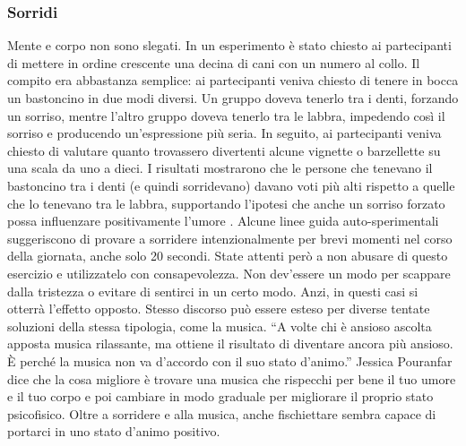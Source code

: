 \documentclass[12pt]{book} %
\begin{document}
\subsubsection{Sorridi}
Mente e corpo non sono slegati. In un esperimento è stato chiesto ai partecipanti di mettere in ordine crescente una
decina di cani con un numero al collo. Il compito era abbastanza semplice: ai partecipanti veniva chiesto di tenere in bocca un bastoncino in due modi diversi. Un gruppo doveva tenerlo tra i denti, forzando un sorriso, mentre l'altro gruppo doveva tenerlo tra le labbra, impedendo così il sorriso e producendo un'espressione più seria. In seguito, ai partecipanti veniva chiesto di valutare quanto trovassero divertenti alcune vignette o barzellette su una scala da uno a dieci. I risultati mostrarono che le persone che tenevano il bastoncino tra i denti (e quindi sorridevano) davano voti più alti rispetto a quelle che lo tenevano tra le labbra, supportando l'ipotesi che anche un sorriso forzato possa influenzare positivamente l’umore   .
Alcune linee guida auto-sperimentali suggeriscono di provare a sorridere intenzionalmente per brevi momenti nel corso della giornata, anche solo 20 secondi. State attenti però a non abusare di questo esercizio e utilizzatelo
con consapevolezza. Non dev'essere un modo per scappare dalla tristezza o evitare di sentirci in
un certo modo. Anzi, in questi casi si otterrà l'effetto opposto. Stesso discorso può essere esteso per diverse tentate soluzioni
della stessa tipologia, come la musica. “A volte chi è ansioso ascolta apposta musica rilassante, ma ottiene il
risultato di diventare ancora più ansioso. È perché la musica non va d'accordo con il suo stato
d'animo.” Jessica Pouranfar dice che la cosa migliore è trovare una musica che rispecchi per bene
il tuo umore e il tuo corpo e poi cambiare in modo graduale per migliorare il proprio stato
psicofisico. 
Oltre a sorridere e alla musica, anche fischiettare sembra capace di portarci in uno stato d'animo positivo.
\end{document}
